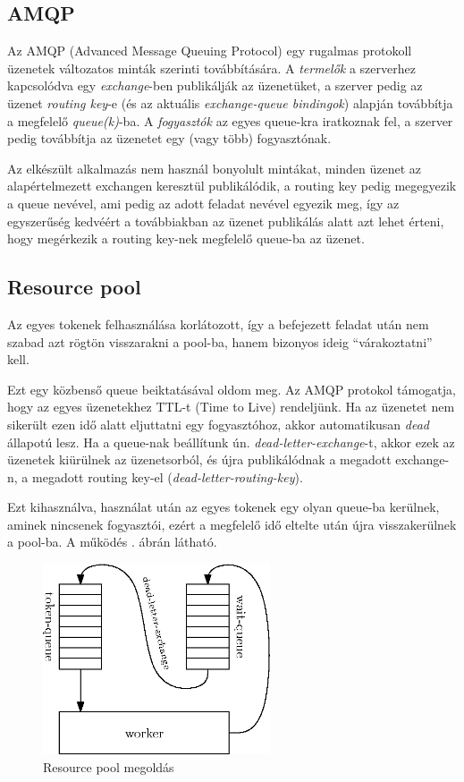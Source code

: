 \subsection{AMQP}

Az AMQP (Advanced Message Queuing Protocol) egy rugalmas protokoll üzenetek
változatos minták szerinti továbbítására. A \emph{termelők} a szerverhez
kapcsolódva egy \emph{exchange}-ben publikálják az üzenetüket,
a szerver pedig az üzenet \emph{routing key}-e
(és az aktuális \emph{exchange-queue bindingok}) alapján továbbítja a
megfelelő \emph{queue(k)}-ba. A \emph{fogyasztók} az egyes queue-kra
iratkoznak fel, a szerver pedig továbbítja az üzenetet egy (vagy több)
fogyasztónak.

Az elkészült alkalmazás nem használ bonyolult mintákat, minden üzenet
az alapértelmezett exchangen keresztül publikálódik, a routing key pedig
megegyezik a queue nevével, ami pedig az adott feladat nevével egyezik meg,
így az egyszerűség kedvéért a továbbiakban az üzenet publikálás alatt
azt lehet érteni, hogy megérkezik a routing key-nek megfelelő queue-ba az
üzenet.

\subsection{Resource pool}

Az egyes tokenek felhasználása korlátozott, így a befejezett feladat után
nem szabad azt rögtön visszarakni a pool-ba, hanem bizonyos ideig
``várakoztatni'' kell.

Ezt egy közbenső queue beiktatásával oldom meg. Az AMQP protokol támogatja,
hogy az egyes üzenetekhez TTL-t (Time to Live) rendeljünk.
Ha az üzenetet nem sikerült ezen idő alatt eljuttatni egy fogyasztóhoz,
akkor automatikusan \emph{dead} állapotú lesz. Ha a queue-nak beállítunk
ún. \emph{dead-letter-exchange}-t, akkor ezek az üzenetek kiürülnek az
üzenetsorból, és újra publikálódnak a megadott exchange-n, a megadott
routing key-el (\emph{dead-letter-routing-key}).

Ezt kihasználva, használat után az egyes tokenek egy olyan queue-ba kerülnek,
aminek nincsenek fogyasztói, ezért a megfelelő idő eltelte után újra
visszakerülnek a pool-ba. A működés . ábrán látható.

\begin{figure}[h!]
  \centering
  \includegraphics[width=0.6\textwidth]{figures/pool}
  \caption{Resource pool megoldás}
  \label{fig:pool}
\end{figure}

